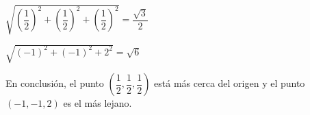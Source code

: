 \documentclass[fleqn, 12pt]{article}
\begin{document}
\begin{list}{\bfseries Ejercicio}{ \addtolength{\itemindent}{-1mm}%
    \addtolength{\labelsep}{-1mm}%
    \addtolength{\leftmargin}{-1cm}%
    \addtolength{\labelwidth}{-1cm} }
    $ \sqrt{\left( \dfrac{1}{2} \right)^2 + \left( \dfrac{1}{2} \right)^2 + \left( \dfrac{1}{2} \right)^2} = \dfrac{\sqrt{3}}{2} $

    $ \sqrt{(-1)^2 + (-1)^2 + 2^2} = \sqrt{6} $

    En conclusión, el punto $ \left( \dfrac{1}{2}, \dfrac{1}{2}, \dfrac{1}{2} \right) $ está más cerca del origen y el punto $ (-1,-1,2) $ es el más lejano.
\end{list}
\end{document}
